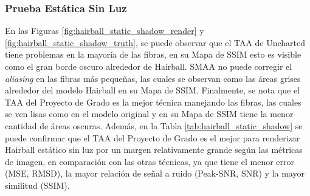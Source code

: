\documentclass[pregrado]{tesis-usb} %
\begin{document}
\subsubsection{Prueba Estática Sin Luz}
En las Figuras \ref{fig:hairball_static_shadow_render} y \ref{fig:hairball_static_shadow_truth}, se puede observar que el TAA de Uncharted tiene problemas en la mayoría de las fibras, en su Mapa de SSIM esto es visible como el gran borde oscuro alrededor de Hairball. SMAA no puede corregir el \textit{aliasing} en las fibras más pequeñas, las cuales se observan como las áreas grises alrededor del modelo Hairball en su Mapa de SSIM. Finalmente, se nota que el TAA del Proyecto de Grado es la mejor técnica manejando las fibras, las cuales se ven lisas como en el modelo original y en su Mapa de SSIM tiene la menor cantidad de áreas oscuras. Además, en la Tabla \ref{tab:hairball_static_shadow} se puede confirmar que el TAA del Proyecto de Grado es el mejor para renderizar Hairball estático sin luz por un margen relativamente grande según las métricas de imagen, en comparación con las otras técnicas, ya que tiene el menor error (MSE, RMSD), la mayor relación de señal a ruido (Peak-SNR, SNR) y la mayor similitud (SSIM). 
\end{document}
